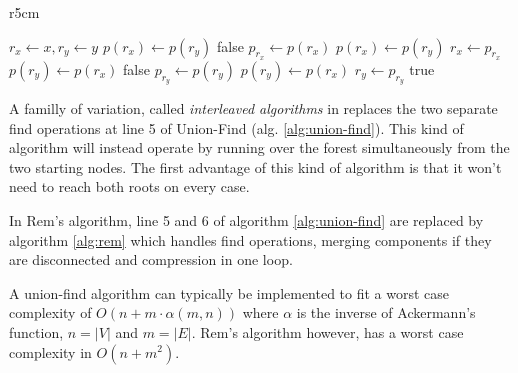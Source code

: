 \documentclass[12px]{article}
\begin{document}
        \setlength\intextsep{0pt}
        \begin{wrapfigure}[17]{r}{5cm}
          \centering
          \begin{minipage}{\linewidth}
            \begin{algorithm}[H]
              \caption{Rem's algorithm}
              \label{alg:rem}
              \begin{algorithmic}[1]
                \State $r_x \gets x, r_y \gets y$
                      \State $p(r_x) \gets p(r_y)$
                      \State \Return false
                    \EndIf
                    \State $p_{r_x} \gets p(r_x)$
                    \State $p(r_x) \gets p(r_y)$
                    \State $r_x \gets p_{r_x}$
                  \Else
                      \State $p(r_y) \gets p(r_x)$
                      \State \Return false
                    \EndIf
                    \State $p_{r_y} \gets p(r_y)$
                    \State $p(r_y) \gets p(r_x)$
                    \State $r_y \gets p_{r_y}$
                  \EndIf
                \EndWhile
                \State \Return true
              \end{algorithmic}
            \end{algorithm}
          \end{minipage}
        \end{wrapfigure}

        A familly of variation, called \emph{interleaved algorithms} in  replaces the two separate find operations at line 5 of Union-Find (alg. \ref{alg:union-find}). This kind of algorithm will instead operate by running over the forest simultaneously from the two starting nodes. The first advantage of this kind of algorithm is that it won't need to reach both roots on every case.

      In Rem's algorithm, line 5 and 6 of algorithm \ref{alg:union-find} are replaced by algorithm \ref{alg:rem} which handles find operations, merging components if they are disconnected and compression in one loop.

      A union-find algorithm can typically be implemented to fit a worst case complexity of $O(n + m \cdot \alpha(m, n))$ where $\alpha$ is the inverse of Ackermann's function, $n = |V|$ and $m = |E|$. Rem's algorithm however, has a worst case complexity in $O(n + m^2)$.
\end{document}
